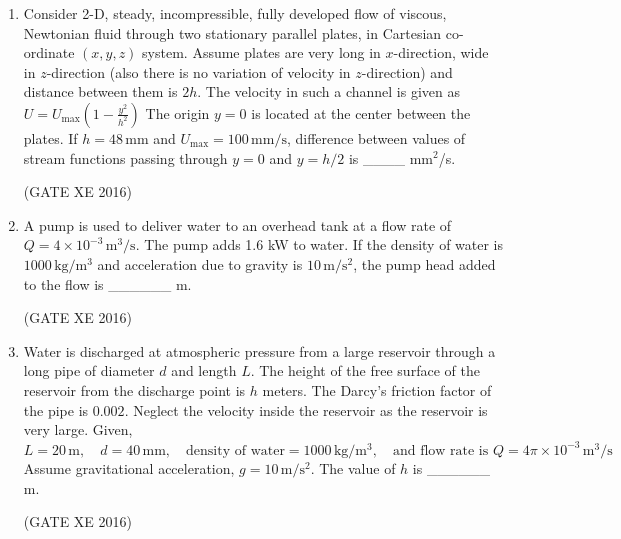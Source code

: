 \documentclass[12pt]{article}
\begin{document}
\begin{enumerate}
\begin{multicols}{4}
\begin{enumerate}
\item (i), (iii) \& (vi)
\item (ii), (iii) \& (vi)
\item (i), (iii) \& (v)
\item (i), (iv) \& (vi)
\end{enumerate}
\end{multicols}

(GATE XE 2016)

\item Consider 2-D, steady, incompressible, fully developed flow of viscous, Newtonian fluid through two stationary parallel plates, in Cartesian co-ordinate $(x,y,z)$ system. Assume plates are very long in $x$-direction, wide in $z$-direction (also there is no variation of velocity in $z$-direction) and distance between them is $2h$. The velocity in such a channel is given as  
$ U = U_{\text{max}} \left(1 - \frac{y^2}{h^2}\right) $
The origin $y=0$ is located at the center between the plates. If $h = 48 \, \text{mm}$ and $U_{\text{max}} = 100 \, \text{mm/s}$, difference between values of stream functions passing through $y=0$ and $y = h/2$ is \_\_\_\_ mm$^2$/s.  

(GATE XE 2016)

\item A pump is used to deliver water to an overhead tank at a flow rate of 
$Q = 4 \times 10^{-3} \, \text{m}^3/\text{s}$. 
The pump adds 1.6 kW to water. If the density of water is 
$1000 \, \text{kg}/\text{m}^3$ and acceleration due to gravity is 
$10 \, \text{m}/\text{s}^2$, the pump head added to the flow is \_\_\_\_\_\_ m.

(GATE XE 2016)

\item Water is discharged at atmospheric pressure from a large reservoir through a long pipe of diameter $d$ and length $L$. The height of the free surface of the reservoir from the discharge point is $h$ meters. The Darcy’s friction factor of the pipe is $0.002$. Neglect the velocity inside the reservoir as the reservoir is very large. Given, $L = 20 \, \text{m}, \quad d = 40 \, \text{mm}, \quad \text{density of water} = 1000 \,\text{kg}/\text{m}^3, \quad \text{and flow rate is } Q = 4 \pi \times 10^{-3} \, \text{m}^3/\text{s}$
Assume gravitational acceleration, $g = 10 \, \text{m}/\text{s}^2$.  
The value of $h$ is \_\_\_\_\_\_ m.

(GATE XE 2016)

\end{enumerate}
\end{document}
